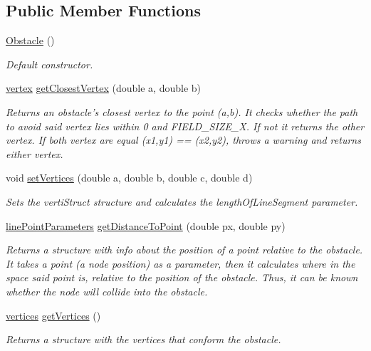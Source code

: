 \subsection*{Public Member Functions}
\begin{DoxyCompactItemize}
\item 
\hypertarget{class_obstacle_a8f734072321fa06a7b7dae2d5f50f352}{\hyperlink{class_obstacle_a8f734072321fa06a7b7dae2d5f50f352}{Obstacle} ()}\label{class_obstacle_a8f734072321fa06a7b7dae2d5f50f352}

\begin{DoxyCompactList}\small\item\em Default constructor. \end{DoxyCompactList}\item 
\hyperlink{struct_obstacle_1_1vertex}{vertex} \hyperlink{class_obstacle_a7470a10c25f5f95451c18bad13aae5d1}{get\-Closest\-Vertex} (double a, double b)
\begin{DoxyCompactList}\small\item\em Returns an obstacle's closest vertex to the point (a,b). It checks whether the path to avoid said vertex lies within 0 and F\-I\-E\-L\-D\-\_\-\-S\-I\-Z\-E\-\_\-\-X. If not it returns the other vertex. If both vertex are equal (x1,y1) == (x2,y2), throws a warning and returns either vertex. \end{DoxyCompactList}\item 
void \hyperlink{class_obstacle_ad5a640f5b6b5fc1716bfa14219661be1}{set\-Vertices} (double a, double b, double c, double d)
\begin{DoxyCompactList}\small\item\em Sets the verti\-Struct structure and calculates the length\-Of\-Line\-Segment parameter. \end{DoxyCompactList}\item 
\hyperlink{struct_obstacle_1_1line_point_parameters}{line\-Point\-Parameters} \hyperlink{class_obstacle_a50c1c5f5130a7b20d04e003ed4e0476f}{get\-Distance\-To\-Point} (double px, double py)
\begin{DoxyCompactList}\small\item\em Returns a structure with info about the position of a point relative to the obstacle. It takes a point (a node position) as a parameter, then it calculates where in the space said point is, relative to the position of the obstacle. Thus, it can be known whether the node will collide into the obstacle. \end{DoxyCompactList}\item 
\hyperlink{struct_obstacle_1_1vertices}{vertices} \hyperlink{class_obstacle_a6a6337e7879e0d938a664d342e849232}{get\-Vertices} ()
\begin{DoxyCompactList}\small\item\em Returns a structure with the vertices that conform the obstacle. \end{DoxyCompactList}\end{DoxyCompactItemize}


